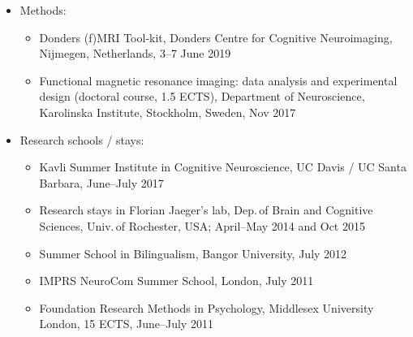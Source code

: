 \documentclass[margin, 11pt]{res} %
\begin{document}
\begin{resume}
\begin{itemize}
\item Methods:
	\begin{itemize}
	\item Donders (f)MRI Tool-kit, Donders Centre for Cognitive Neuroimaging, Nijmegen, Netherlands, 3--7 June 2019
	\item Functional magnetic resonance imaging: data analysis and experimental design (doctoral course, 1.5 ECTS), Department of Neuroscience, Karolinska Institute, Stockholm, Sweden, Nov 2017
	\end{itemize}

\item Research schools / stays:
	\begin{itemize}
	\item Kavli Summer Institute in Cognitive Neuroscience, UC Davis / UC Santa Barbara, June--July 2017	
	\item Research stays in Florian Jaeger's lab, Dep.\,of Brain and Cognitive Sciences, Univ.\,of Rochester, USA; April--May 2014 and Oct 2015
	\item Summer School in Bilingualism, Bangor University, July 2012
	\item IMPRS NeuroCom Summer School, London, July 2011 %
	\item Foundation Research Methods in Psychology, Middlesex University London, 15 ECTS, June--July 2011
	\end{itemize}
 
 \end{itemize}








\end{resume}
\end{document}
